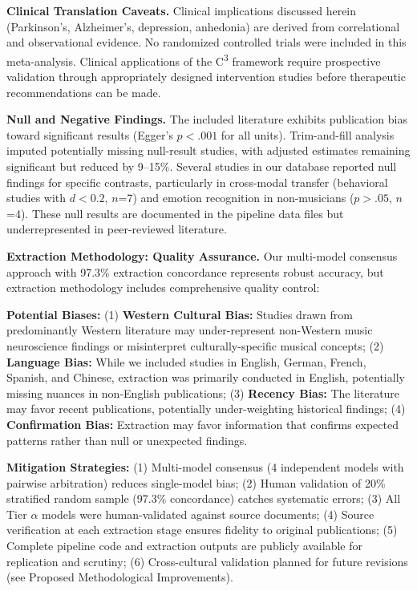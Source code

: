 \documentclass[9pt,onecolumn]{article}
\newcommand{\Cthree}{C\textsuperscript{3}}
\begin{document}
\textbf{Clinical Translation Caveats.} Clinical implications discussed herein (Parkinson's, Alzheimer's, depression, anhedonia) are derived from correlational and observational evidence. No randomized controlled trials were included in this meta-analysis. Clinical applications of the \Cthree{} framework require prospective validation through appropriately designed intervention studies before therapeutic recommendations can be made.

\textbf{Null and Negative Findings.} The included literature exhibits publication bias toward significant results (Egger's $p < .001$ for all units). Trim-and-fill analysis imputed potentially missing null-result studies, with adjusted estimates remaining significant but reduced by 9--15\%. Several studies in our database reported null findings for specific contrasts, particularly in cross-modal transfer (behavioral studies with $d < 0.2$, $n$=7) and emotion recognition in non-musicians ($p > .05$, $n$=4). These null results are documented in the pipeline data files but underrepresented in peer-reviewed literature.

\textbf{Extraction Methodology: Quality Assurance.} Our multi-model consensus approach with 97.3\% extraction concordance represents robust accuracy, but extraction methodology includes comprehensive quality control:

\textbf{Potential Biases:} (1) \textbf{Western Cultural Bias:} Studies drawn from predominantly Western literature may under-represent non-Western music neuroscience findings or misinterpret culturally-specific musical concepts; (2) \textbf{Language Bias:} While we included studies in English, German, French, Spanish, and Chinese, extraction was primarily conducted in English, potentially missing nuances in non-English publications; (3) \textbf{Recency Bias:} The literature may favor recent publications, potentially under-weighting historical findings; (4) \textbf{Confirmation Bias:} Extraction may favor information that confirms expected patterns rather than null or unexpected findings.

\textbf{Mitigation Strategies:} (1) Multi-model consensus (4 independent models with pairwise arbitration) reduces single-model bias; (2) Human validation of 20\% stratified random sample (97.3\% concordance) catches systematic errors; (3) All Tier $\alpha$ models were human-validated against source documents; (4) Source verification at each extraction stage ensures fidelity to original publications; (5) Complete pipeline code and extraction outputs are publicly available for replication and scrutiny; (6) Cross-cultural validation planned for future revisions (see Proposed Methodological Improvements).
\end{document}
